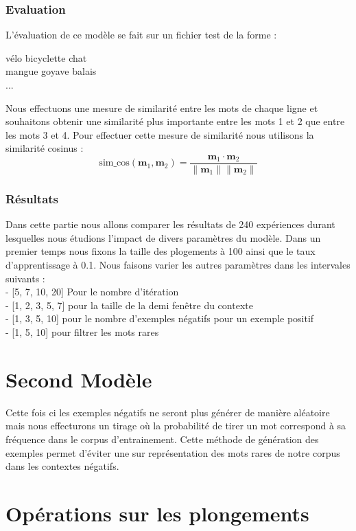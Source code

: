 \documentclass[12pt]{article}
\begin{document}
\subsubsection{Evaluation}
L'évaluation de ce modèle se fait sur un fichier test de la forme :
\begin{center}
vélo bicyclette chat\\
mangue goyave balais\\
...\\
\end{center}
Nous effectuons une mesure de similarité entre les mots de chaque ligne et souhaitons obtenir
une similarité plus importante entre les mots 1 et 2 que entre les mots 3 et 4. Pour effectuer cette mesure de 
similarité nous utilisons la similarité cosinus :
\[
\text{sim\_cos}(\mathbf{m}_1, \mathbf{m}_2) = \frac{\mathbf{m}_1 \cdot \mathbf{m}_2}{\|\mathbf{m}_1\| \|\mathbf{m}_2\|}
\]
\subsubsection{Résultats}
Dans cette partie nous allons comparer les résultats de 240 expériences durant lesquelles nous étudions l'impact de divers paramètres du modèle.
Dans un premier temps nous fixons la taille des plogements à 100 ainsi que le taux d'apprentissage à 0.1. 
Nous faisons varier les autres paramètres dans les intervales suivants : \\
- [5, 7, 10, 20] Pour le nombre d'itération \\
- [1, 2, 3, 5, 7] pour la taille de la demi fenêtre du contexte \\
- [1, 3, 5, 10] pour le nombre d'exemples négatifs pour un exemple positif \\
- [1, 5, 10] pour filtrer les mots rares \\

\section{Second Modèle}

Cette fois ci les exemples négatifs ne seront plus générer de manière aléatoire mais nous effecturons 
un tirage où la probabilité de tirer un mot correspond à sa fréquence dans le corpus d'entrainement.
Cette méthode de génération des exemples permet d'éviter une sur représentation des mots rares de notre 
corpus dans les contextes négatifs.

\section{Opérations sur les plongements} 
\end{document}

